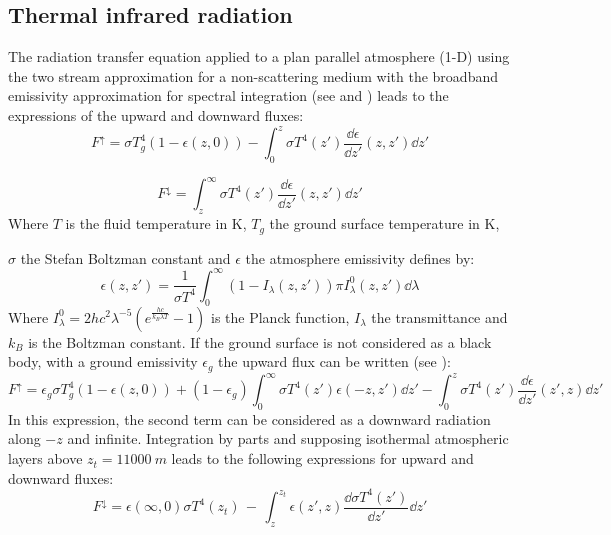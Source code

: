 \subsection{Thermal infrared radiation}
The radiation transfer equation applied to a plan parallel atmosphere (1-D)
using the two stream approximation for a non-scattering medium with the
broadband emissivity approximation for spectral integration (see \cite{Liou:2002}
and \cite{Makke:2016}) leads to the expressions of the upward
and downward fluxes:
\begin{equation}
F^\uparrow =\sigma T_{g}^{4}\left( 1-\epsilon \left( z,0 \right)
\right)-\int_0^z \sigma T^{4}\left( z' \right)\frac{\dd \epsilon
}{\dd z'}\left( z,z' \right)\dd z'
\end{equation}

\begin{equation}
F^\downarrow =\int_z^\infty \sigma T^{4}\left( z' \right)\frac{\dd \epsilon
}{\dd z'}\left( z,z' \right)\dd z'
\end{equation}
Where $T$ is the fluid temperature in \si{K}, $T_{g}$ the ground surface temperature in \si{K},

$\sigma $ the Stefan Boltzman constant and $\epsilon$ the atmosphere
emissivity defines by:
\begin{equation}
\epsilon \left( z,z' \right)
=\frac{1}{\sigma T^{4}}\int_0^\infty {\left(1-I_{\lambda}\left(z,z'
\right) \right)\pi I_{\lambda}^{0}} \left( z,z' \right)\dd\lambda
\end{equation}
\newline
Where
$I_{\lambda }^{0}=
{2 hc^{2}\lambda^{-5}}
{\left(e^{\frac{{hc}}{k_{B} \lambda T}}-1\right)}$ is the Planck function,
\newline
$I_{\lambda}$ the transmittance and $k_{B}$ is the Boltzman constant.
\newline
\newline
If the ground surface is not considered as a black body, with a ground
emissivity $\epsilon_{g}$ the upward flux can be written (see \cite{Ponnulakshmi:2012}):
\newline
\begin{equation}
F^\uparrow =\epsilon_{g}\sigma T_{g}^{4}\left( 1-\epsilon \left( z,0
\right) \right)+\left( 1-\epsilon_{g} \right)\int_0^\infty {\sigma
T^{4}} \left( z' \right)\epsilon \left( -z,z' \right)\dd z'-\int_0^z
{\sigma T^{4}\left( z' \right)\frac{\dd\epsilon }{\dd z'}\left(z',z
\right)\dd z'}
\end{equation}
\newline
In this expression, the second term can be considered as a downward
radiation along $-z$ and infinite. Integration by parts and supposing
isothermal atmospheric layers above $z_t = \SI{11000}{m}$  leads to the following
expressions for upward and downward fluxes:
\newline
\begin{equation}
F^\downarrow =\epsilon \left( \infty ,0 \right)\sigma T^{4}\left( z_t
\right)\, -\, \int_z^{z_t} {\epsilon (z',z)\frac{\dd \sigma
T^{4}(z')}{\dd z'}\dd z'}
\end{equation}


